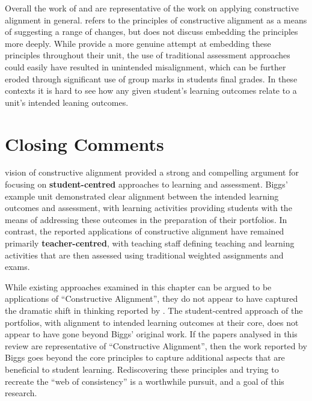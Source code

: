 Overall the work of \citet{Gaspar:2012} and \citet{Thota:2010} are representative of the work on applying constructive alignment in general. \citet{Gaspar:2012} refers to the principles of constructive alignment \cite{Biggs:1996c} as a means of suggesting a range of changes, but does not discuss embedding the principles more deeply. While \citet{Thota:2010} provide a more genuine attempt at embedding these principles throughout their unit, the use of traditional assessment approaches could easily have resulted in unintended misalignment, which can be further eroded through significant use of group marks in students final grades. In these contexts it is hard to see how any given student's learning outcomes relate to a unit's intended leaning outcomes.


\clearpage
\section{Closing Comments} %
\label{sec:closing_comments}

\citet{Biggs:1996c} vision of constructive alignment provided a strong and compelling argument for focusing on \textbf{student-centred} approaches to learning and assessment. Biggs' example unit demonstrated clear alignment between the intended learning outcomes and assessment, with learning activities providing students with the means of addressing these outcomes in the preparation of their portfolios. In contrast, the reported applications of constructive alignment have remained primarily \textbf{teacher-centred}, with teaching staff defining teaching and learning activities that are then assessed using traditional weighted assignments and exams.

While existing approaches examined in this chapter can be argued to be applications of ``Constructive Alignment'', they do not appear to have captured the dramatic shift in thinking reported by \citet{Biggs:1996c}. The student-centred approach of the portfolios, with alignment to intended learning outcomes at their core, does not appear to have gone beyond Biggs' original work. If the papers analysed in this review are representative of ``Constructive Alignment'', then the work reported by Biggs goes beyond the core principles to capture additional aspects that are beneficial to student learning. Rediscovering these principles and trying to recreate the ``web of consistency'' is a worthwhile pursuit, and a goal of this research.


